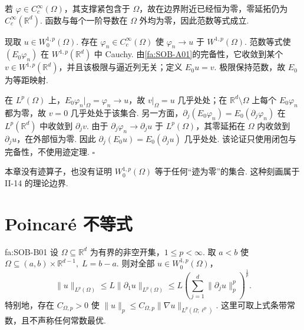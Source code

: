 \begin{FAProof}
若 \(\displaystyle\varphi\in C_c^\infty(\Omega)\)，其支撑紧包含于 \(\displaystyle\Omega\)，故在边界附近已经恒为零，零延拓仍为 \(\displaystyle C_c^\infty(\mathbb R^d)\). 函数与每个一阶导数在 \(\displaystyle\Omega\) 外均为零，因此范数等式成立.

现取 \(\displaystyle u\in W_0^{1,p}(\Omega)\). 存在 \(\displaystyle\varphi_n\in C_c^\infty(\Omega)\) 使 \(\displaystyle\varphi_n\to u\) 于 \(\displaystyle W^{1,p}(\Omega)\). 范数等式使 \(\displaystyle(E_0\varphi_n)\) 在 \(\displaystyle W^{1,p}(\mathbb R^d)\) 中 Cauchy. 由\autoref{fa:SOB-A01}的完备性，它收敛到某个 \(\displaystyle v\in W^{1,p}(\mathbb R^d)\)，并且该极限与逼近列无关；定义 \(\displaystyle E_0u=v\). 极限保持范数，故 \(\displaystyle E_0\) 为等距映射.

在 \(\displaystyle L^p(\Omega)\) 上，\(\displaystyle E_0\varphi_n|_\Omega=\varphi_n\to u\)，故 \(\displaystyle v|_\Omega=u\) 几乎处处；在 \(\displaystyle\mathbb R^d\setminus\Omega\) 上每个 \(\displaystyle E_0\varphi_n\) 都为零，故 \(\displaystyle v=0\) 几乎处处于该集合. 另一方面，\(\displaystyle\partial_j(E_0\varphi_n)=E_0(\partial_j\varphi_n)\) 在 \(\displaystyle L^p(\mathbb R^d)\) 中收敛到 \(\displaystyle\partial_jv\). 由于 \(\displaystyle\partial_j\varphi_n\to\partial_ju\) 于 \(\displaystyle L^p(\Omega)\)，其零延拓在 \(\displaystyle\Omega\) 内收敛到 \(\displaystyle\partial_ju\)，在外部恒为零. 因此 \(\displaystyle\partial_j(E_0u)=E_0(\partial_ju)\) 几乎处处. 该论证只使用闭包与完备性，不使用迹定理.
\hfill\(\square\)
\end{FAProof}

\begin{FAWarning}[零边界不等于已证明的零迹]
本章没有迹算子，也没有证明 \(\displaystyle W_0^{1,p}(\Omega)\) 等于任何“迹为零”的集合. 这种刻画属于 II-14 的理论边界.
\end{FAWarning}

\section{Poincaré 不等式}\label{sec:ii13-poincare}

\begin{FATheorem}{fa:SOB-B01}
设 \(\displaystyle\Omega\subseteq\mathbb R^d\) 为有界的非空开集，\(\displaystyle1\leqslant p<\infty\). 取 \(\displaystyle a<b\) 使 \(\displaystyle \Omega \subseteq (a,b)\times\mathbb R^{d-1}, \; L=b-a.\)
则对全部 \(\displaystyle u\in W_0^{1,p}(\Omega)\)，
\[
\|u\|_{L^p(\Omega)}
\leqslant
L\|\partial_1u\|_{L^p(\Omega)}
\leqslant
L
\left(
\sum_{j=1}^d\|\partial_ju\|_p^p
\right)^{\frac{1}{p}}.
\]
特别地，存在 \(\displaystyle C_{\Omega,p}>0\) 使 \(\displaystyle \|u\|_p \leqslant C_{\Omega,p} \|\nabla u\|_{L^p(\Omega;\ell^p)}.\)
这里可取上式条带常数，且不声称任何常数最优.
\end{FATheorem}

